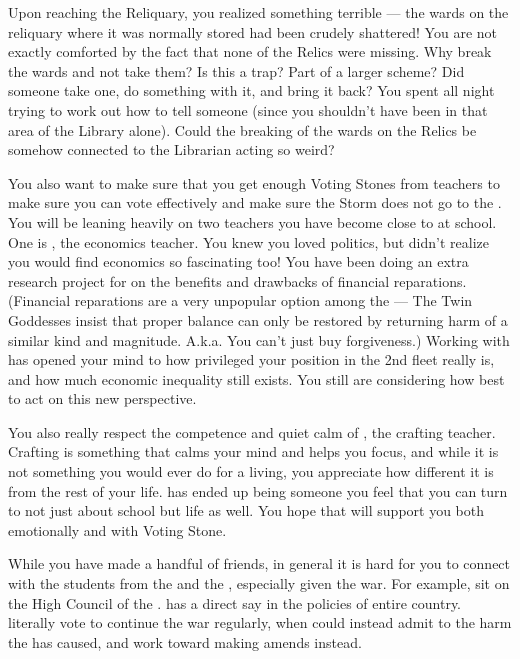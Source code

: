 \documentclass[char]{GL2020}
\begin{document}
Upon reaching the Reliquary, you realized something terrible — the wards on the reliquary where it was normally stored had been crudely shattered! You are not exactly comforted by the fact that none of the Relics were missing. Why break the wards and not take them? Is this a trap? Part of a larger scheme? Did someone take one, do something with it, and bring it back? You spent all night trying to work out how to tell someone (since you shouldn't have been in that area of the Library alone). Could the breaking of the wards on the Relics be somehow connected to the Librarian acting so weird?

You also want to make sure that you get enough Voting Stones from teachers to make sure you can vote effectively and make sure the Storm does not go to the \pShip{}. You will be leaning heavily on two teachers you have become close to at school. One is \cChupSecond{\full}, the economics teacher. You knew you loved politics, but didn’t realize you would find economics so fascinating too! You have been doing an extra research project for \cChupSecond{\them} on the benefits and drawbacks of financial reparations. (Financial reparations are a very unpopular option among the \pShippies{} — The Twin Goddesses insist that proper balance can only be restored by returning harm of a similar kind and magnitude. A.k.a. You can’t just buy forgiveness.) Working with \cChupSecond{\them} has opened your mind to how privileged your position in the 2nd fleet really is, and how much economic inequality still exists. You still are considering how best to act on this new perspective. 

You also really respect the competence and quiet calm of \cPirate{\full}, the crafting teacher. Crafting is something that calms your mind and helps you focus, and while it is not something you would ever do for a living, you appreciate how different it is from the rest of your life. \cPirate{} has ended up being someone you feel that you can turn to not just about school but life as well. You hope that \cPirate{\they} will support you both emotionally and with \cPirate{\their} Voting Stone.  

While you have made a handful of friends, in general it is hard for you to connect with the students from the \pTech{} and the \pFarm{}, especially given the war. For example, \cTechStar{\full} sit\cTechStar{\verbs} on the High Council of the \pTech{}. \cTechStar{} has a direct say in the policies of \cTechStar{\their} entire country. \cTechStar{\They} literally vote to continue the war regularly, when \cTechStar{\they} could instead admit to the harm the \pTech{} has caused, and work toward making amends instead. 
\end{document}
